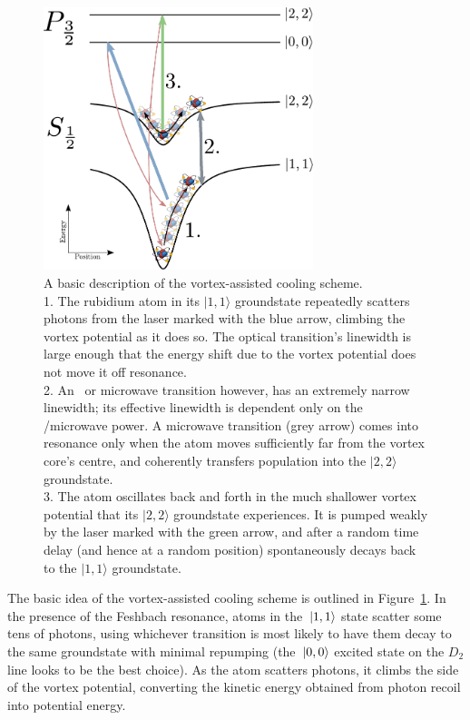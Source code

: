 \begin{figure}
\begin{center}
\includegraphics[width=0.7\textwidth]{figures/unsorted/vortexcooling.pdf}
\caption{A basic description of the vortex-assisted cooling scheme.
\protect\\
1. The rubidium atom in its $|1,1\rangle$ groundstate repeatedly scatters photons from the laser marked with the blue arrow, climbing the vortex potential as it does so. The optical transition's linewidth is large enough that the energy shift due to the vortex potential does not move it off resonance.
\protect\\
 2. An \rf\ or microwave transition however, has an extremely narrow linewidth; its effective linewidth is dependent only on the \rf/microwave power. A microwave transition (grey arrow) comes into resonance only when the atom moves sufficiently far from the vortex core's centre, and coherently transfers population into the $|2,2\rangle$ groundstate.
 \protect\\
 3. The atom oscillates back and forth in the much shallower vortex potential that its $|2,2\rangle$ groundstate experiences. It is pumped weakly by the laser marked with the green arrow, and after a random time delay (and hence at a random position) spontaneously decays back to the $|1,1\rangle$ groundstate.
}\label{fig:vortexcooling}
\end{center}
\end{figure}

The basic idea of the vortex-assisted cooling scheme is outlined in Figure~\ref{fig:vortexcooling}. In the presence of the Feshbach resonance, atoms in the $\ket{1,1}$ state scatter some tens of photons, using whichever transition is most likely to have them decay to the same groundstate with minimal repumping (the $\ket{0,0}$ excited state on the $D_2$ line looks to be the best choice). As the atom scatters photons, it climbs the side of the vortex potential, converting the kinetic energy obtained from photon recoil into potential energy.

